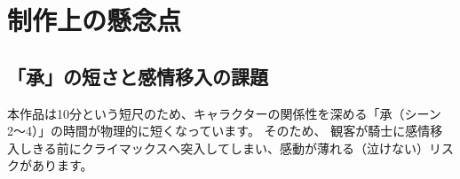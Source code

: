 \clearpage\section{制作上の懸念点}
\subsection{「承」の短さと感情移入の課題}
本作品は10分という短尺のため、キャラクターの関係性を深める「承（シーン2〜4）」の時間が物理的に短くなっています。
そのため、
観客が騎士に感情移入しきる前にクライマックスへ突入してしまい、感動が薄れる（泣けない）リスクがあります。

